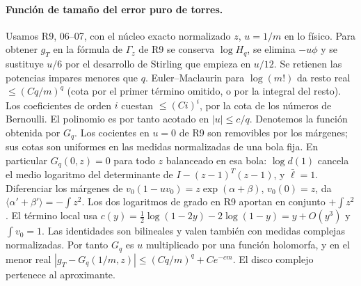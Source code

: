 \paragraph{Función de tamaño del error puro de torres.}
Usamos R9, 06--07, con el núcleo exacto normalizado $z$, $u=1/m$ en lo físico. Para
obtener $g_T$ en la fórmula de $\Gamma_z$ de R9 se conserva $\log H_q$, se elimina
$-u\phi$ y se sustituye $u/6$ por el desarrollo de Stirling que empieza en $u/12$.
Se retienen las potencias impares menores que $q$. Euler--Maclaurin para $\log(m!)$ da
resto real $\le(Cq/m)^q$ (cota por el primer término omitido, o por la integral del resto).
Los coeficientes de orden $i$ cuestan $\le(Ci)^i$, por la cota de los números de Bernoulli.
El polinomio es por tanto acotado en $|u|\le c/q$. Denotemos la función obtenida por $G_q$.
Los cocientes en $u=0$ de R9 son removibles por los márgenes; sus cotas son uniformes
en las medidas normalizadas de una bola fija. En particular $G_q(0,z)=0$ para todo
$z$ balanceado en esa bola: $\log d(1)$ cancela el medio logaritmo del determinante
de $I-(z-1)^T(z-1)$, y $\bar\ell=1$. Diferenciar los márgenes de
$v_0(1-uv_0)=z\exp(\alpha+\beta)$, $v_0(0)=z$, da
$\langle\alpha'+\beta'\rangle=-\int z^2$. Los dos logaritmos de grado en R9
aportan en conjunto $+\int z^2$. El término local usa
$c(y)=\tfrac12\log(1-2y)-2\log(1-y)=y+O(y^3)$ y $\int v_0=1$.
Las identidades son bilineales y valen también con medidas complejas normalizadas.
Por tanto $G_q$ es $u$ multiplicado por una función holomorfa, y en el menor real
$|g_T-G_q(1/m,z)|\le (Cq/m)^q+Ce^{-cm}$. El disco complejo pertenece al aproximante.
